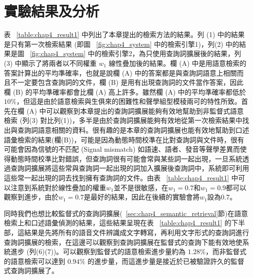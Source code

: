 \section{實驗結果及分析}
表 ~\ref{table:chap4_result1} 中列出了本章提出的檢索方法的結果。列 (1) 中的結果是只有第一次檢索結果 (即圖 ~\ref{fig:chap4_system} 中的檢索引擎1)，列(2) 中的結果是圖 ~\ref{fig:chap4_system} 中的檢索引擎2，為只使用查詢詞擴展後的結果，列 (3) 中顯示了將兩者以不同權重 $w_1$ 線性疊加後的結果。欄 (A) 中是用語意檢索的答案計算出的平均準確率，也就是說欄 (A) 中的答案都是與查詢詞語意上相關而且不一定要包含查詢詞的文件，欄 (B)
是用有出現查詢詞的文件當作答案，因此欄 (B) 的平均準確率都會比欄 (A) 高上許多。雖然欄 (A) 中的平均準確率都低於 $ 10\% $，但這是由於語意檢索與生俱來的困難性和聲學組型模稜兩可的特性所致。首先在欄 (A) 中可以觀察到本章提出的查詢詞擴展能夠有效地幫助到非監督式語意檢索 (列(3)
對比列(1))，多半是由於查詢詞擴展能夠有效地從第一次檢索結果中找出與查詢詞語意相關的資料。很有趣的是本章的查詢詞擴展也能有效地幫助到口述語彙檢索的結果(欄(B))，可能是因為動態時間校準在比對查詢詞與文件時，很有可能會因為信號的不匹配 (Signal mismatch)
如語速、語者、發音等聲學差異而使得動態時間校準比對錯誤，但查詢詞很有可能會常與某些詞一起出現，一旦系統透過查詢詞擴展將這些常與查詢詞一起出現的詞加入擴展後查詢詞中，系統即可利用這些常一起出現的詞去找到擁有查詢詞的文件。由表 ~\ref{table:chap4_result1} 中可以注意到系統對於線性疊加的權重$w_1$並不是很敏感，在$w_1=0.7$和$w_1=0.9$都可以觀察到進步，由於$w_1=0.7$是最好的結果，因此在後續的實驗會將$w_1$設為$0.7$。

同時我們也想比較監督式的查詢詞擴展(~\ref{sec:chap4_semantic_retrieval}節)在語意檢索上和口述語彙偵測的結果，這些結果呈現在表 ~\ref{table:chap4_result1} 的下半部，這結果是先將所有的語音文件辨識成文字轉寫，再利用文字形式的查詢詞進行查詢詞擴展的檢索，在這邊可以觀察到查詢詞擴展在監督式的查詢下能有效地使系統進步 (列(6)(7))。可以觀察到監督式的語意檢索進步量約為 $1.28\%$，而非監督式的語意檢索可以達到 $0.94\%$ 的進步量，而這進步量是接近於已被驗證許久的監督式查詢詞擴展了。

